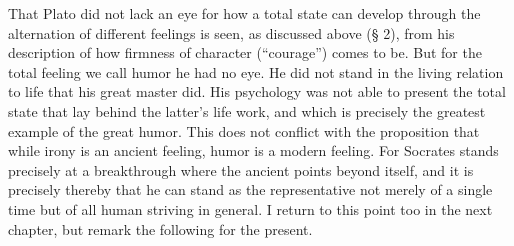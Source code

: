 \documentclass[12pt]{book}
\begin{document}
That Plato did not lack an eye for how a total state can develop through the alternation of
different feelings is seen, as discussed above (§ 2), from his description of how firmness of
character (``courage'') comes to be. But for the total feeling we call humor he had no eye. He
did not stand in the living relation to life that his great master did. His psychology was
not able to present the total state that lay behind the latter's life work, and which is
precisely the greatest example of the great humor. This does not conflict with the
proposition that while irony is an ancient feeling, humor is a modern feeling. For Socrates
stands precisely at a breakthrough where the ancient points beyond itself, and it is precisely
thereby that he can stand as the representative not merely of a single time but of all human
striving in general. I return to this point too in the next chapter, but remark the following
for the present.
\end{document}
